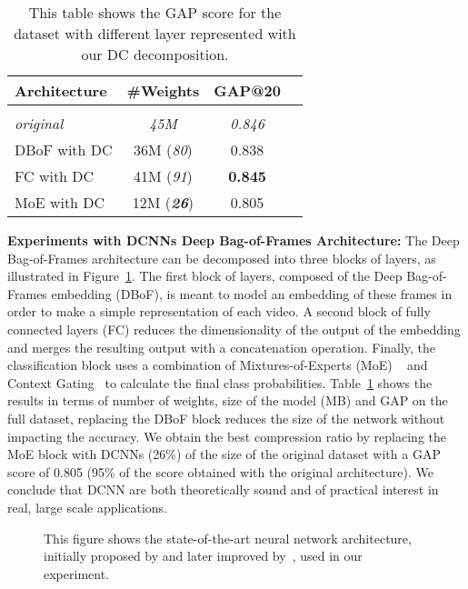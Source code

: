\begin{table}
  \centering
  \caption{This table shows the GAP score for the \yt dataset with different layer represented with our DC decomposition.}
  \begin{tabular}{lccc}
  \toprule
  \textbf{Architecture} & \textbf{\#Weights} & \textbf{GAP@20} \\
  \hline \\
  \textit{original} & \textit{45M} & \textit{0.846} \\
  DBoF with DC   & 36M (\textit{80}) & 0.838 \\
  FC with DC    & 41M (\textit{91}) & \textbf{0.845} \\
  MoE with DC   & 12M (\textit{\textbf{26}}) & 0.805 \\
  \hline
  \end{tabular}
  \label{table:youtube_full_xp}
\end{table}

\textbf{Experiments with DCNNs Deep Bag-of-Frames Architecture:} The Deep Bag-of-Frames architecture can be decomposed into three blocks of layers, as illustrated in Figure~\ref{fig:archi_youtube}.
The first block of layers, composed of the Deep Bag-of-Frames embedding (DBoF), is meant to model an embedding of these frames in order to make a simple representation of each video. A second block of fully connected layers (FC) reduces the dimensionality of the output of the embedding and merges the resulting output with a concatenation operation. Finally, the classification block uses a combination of Mixtures-of-Experts (MoE) ~\cite{716791,45619} and Context Gating~\cite{miech2017learnable} to calculate the final class probabilities. Table~\ref{table:youtube_full_xp} shows the results in terms of number of weights, size of the model (MB) and GAP on the full dataset, replacing the DBoF block reduces the size of the network without impacting the accuracy. We obtain the best compression ratio by replacing the MoE block with DCNNs (26\%) of the size of the original dataset with a GAP score of 0.805 (95\% of the score obtained with the original architecture). We conclude that DCNN are both theoretically sound and of practical interest in real, large scale applications.

\begin{figure}[htb]
  \centering
  \scalebox{.72}{}
  \caption{This figure shows the state-of-the-art neural network architecture, initially proposed by \cite{abu2016youtube} and later improved by~\cite{miech2017learnable}, used in our experiment. }
  \label{fig:archi_youtube}
\end{figure}

